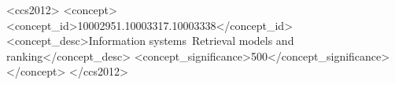 \documentclass[sigconf,natbib=true,anonymous=false]{acmart}
\newcommand{\todo}[1]{\textcolor{red}{#1}}
\begin{document}
\begin{abstract}




\end{abstract}

%
%

\begin{CCSXML}
	<ccs2012>
	<concept>
	<concept_id>10002951.10003317.10003338</concept_id>
	<concept_desc>Information systems~Retrieval models and ranking</concept_desc>
	<concept_significance>500</concept_significance>
	</concept>
	</ccs2012>
\end{CCSXML}
\end{document}
